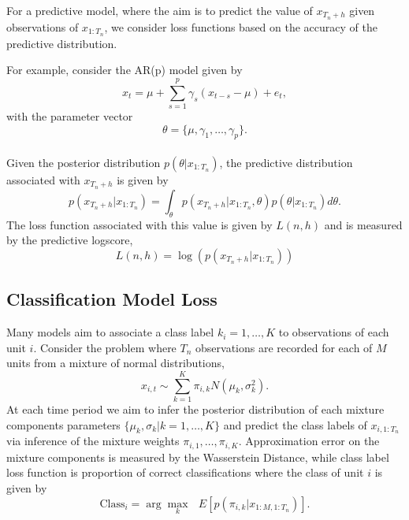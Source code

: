 \documentclass[12pt,a4paper]{article}\usepackage[]{graphicx}\usepackage[]{color}
\begin{document}
For a predictive model, where the aim is to predict the value of $x_{T_n + h}$ given observations of $x_{1:T_n}$, we consider loss functions based on the accuracy of the predictive distribution.

For example, consider the AR(p) model given by
\begin{equation}
x_t = \mu + \sum_{s=1}^p \gamma_s (x_{t-s} - \mu) + e_t,
\end{equation}
with the parameter vector
\begin{equation}
\theta = \{\mu, \gamma_1, \dots, \gamma_p \}.
\end{equation}
\\

Given the posterior distribution $p(\theta | x_{1:T_n})$, the predictive distribution associated with $x_{T_n +h}$ is given by
\begin{equation}
p(x_{T_n + h} | x_{1:T_n}) = \int_{\theta} p(x_{T_n + h} | x_{1:T_n}, \theta)p(\theta | x_{1:T_n})d\theta.
\end{equation}
The loss function associated with this value is given by $L(n, h)$ and is measured by the predictive logscore,
\begin{equation}
L(n, h) = \log(p(x_{T_n + h} | x_{1:T_n}))
\end{equation}

\subsection{Classification Model Loss}

Many models aim to associate a class label $k_i = 1 , \dots, K$ to observations of each unit $i$. Consider the problem where $T_n$ observations are recorded for each of $M$ units from a mixture of normal distributions,
\begin{equation}
\label{mixNormalDGP}
x_{i, t} \sim \sum_{k=1}^K \pi_{i, k} N(\mu_k, \sigma^2_{k}).
\end{equation}
At each time period we aim to infer the posterior distribution of each mixture components parameters $\{\mu_k, \sigma_k | k = 1, \dots, K\}$ and predict the class labels of $x_{i, 1:T_n}$ via inference of the mixture weights $\pi_{i, 1}, \dots, \pi_{i, K}$. Approximation error on the mixture components is measured by the Wasserstein Distance, while class label loss function is proportion of correct classifications where the class of unit $i$ is given by
\begin{equation}
\mbox{Class}_{i} = \arg \underset{k}{\max} \mbox{ } E[p(\pi_{i, k} |  x_{1:M, 1:T_n})].
\end{equation}
\end{document}
